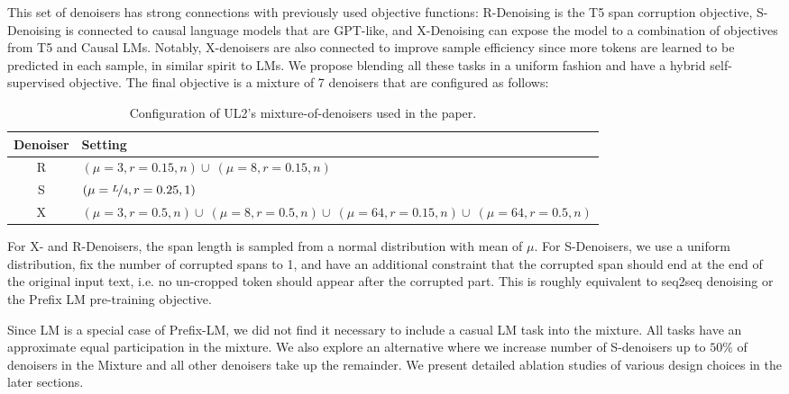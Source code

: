 \documentclass[10pt]{article}
\begin{document}
This set of denoisers has strong connections with previously used objective functions: R-Denoising is the T5 span corruption objective, S-Denoising is connected to causal language models that are GPT-like, and X-Denoising can expose the model to a combination of objectives from T5 and Causal LMs. Notably, X-denoisers are also connected to improve sample efficiency since more tokens are learned to be predicted in each sample, in similar spirit to LMs. We propose blending all these tasks in a uniform fashion and have a hybrid self-supervised objective. The final objective is a mixture of 7 denoisers that are configured as follows: 
\begin{table}[H]
    \centering
    \begin{tabular}{cp{8cm}}
    \toprule
    Denoiser & Setting \\
    \midrule
      R   &  $(\mu=3, r=0.15, n) \cup \: (\mu=8, r=0.15, n)$\\
      S   & $(\mu=\nicefrac{L}{4}, r=0.25, 1)$ \\ 
      X &  $(\mu=3, r=0.5, n) \cup \:
            (\mu=8, r=0.5, n) \cup \:
            (\mu=64, r=0.15, n) \cup \:
            (\mu=64, r=0.5, n)$ \\
\bottomrule
    \end{tabular}
    \caption{Configuration of UL2's mixture-of-denoisers used in the paper.}
    \label{tab:my_label}
\end{table}







For X- and R-Denoisers, the span length is sampled from a normal distribution with mean of $\mu$. For S-Denoisers, we use a uniform distribution, fix the number of corrupted spans to 1, and have an additional constraint that the corrupted span should end at the end of the original input text, i.e. no un-cropped token should appear after the corrupted part. This is roughly equivalent to seq2seq denoising or the Prefix LM pre-training objective. 

Since LM is a special case of Prefix-LM, we did not find it necessary to include a casual LM task into the mixture. All tasks have an approximate equal participation in the mixture. We also explore an alternative where we increase number of S-denoisers up to $50\%$ of denoisers in the Mixture and all other denoisers take up the remainder. We present detailed ablation studies of various design choices in the later sections.
\end{document}
